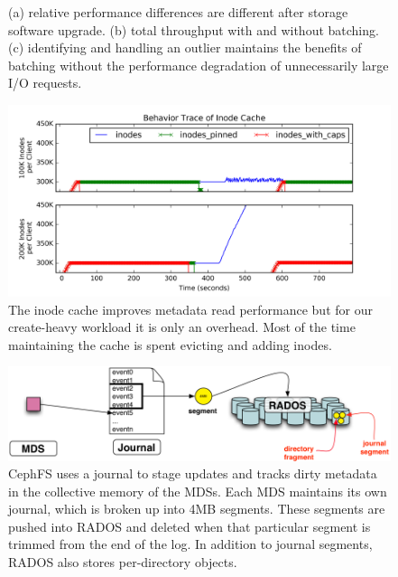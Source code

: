 \begin{figure}[t]
\begin{subfigure}[b]{.3\linewidth}
      \caption{}
      \label{fig:batching-outlier}
  \end{subfigure}
  \caption{(a) relative performance differences are different after storage
  software upgrade. (b) total throughput with and without batching. (c)
  identifying and handling an outlier maintains the benefits
  of batching without the performance degradation of unnecessarily large I/O
  requests.}
\end{figure}

\begin{figure}[tb] \centering
\includegraphics[width=1\linewidth]{./graphs/behavior-cache.png} 
\caption{The inode cache improves metadata read performance but for our
create-heavy workload it is only an overhead. Most of the time maintaining the
cache is spent evicting and adding inodes.}\label{fig:inode-cache}
\end{figure}

\begin{figure}[tb] \centering
\includegraphics[width=1\linewidth]{./figures/journal.png} 
\caption{CephFS uses a journal to stage updates and tracks dirty metadata in
the collective memory of the MDSs. Each MDS maintains its own journal, which is
broken up into 4MB segments. These segments are pushed into RADOS and deleted
when that particular segment is trimmed from the end of the log. In addition to
journal segments, RADOS also stores per-directory objects. \label{fig:journal}}
\end{figure}


